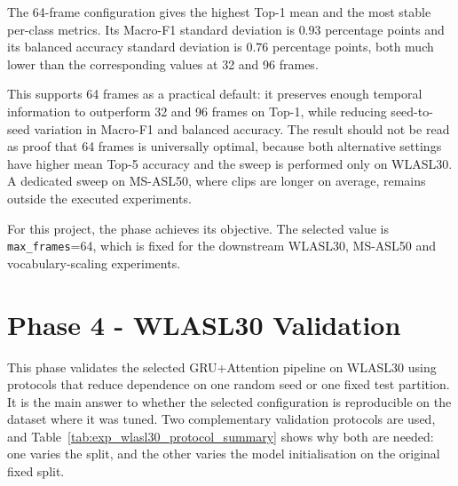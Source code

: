 \FloatBarrier

The 64-frame configuration gives the highest Top-1 mean and the most stable per-class metrics. Its
Macro-F1 standard deviation is $0.93$ percentage points and its balanced accuracy standard
deviation is $0.76$ percentage points, both much lower than the corresponding values at 32 and 96
frames.

This supports 64 frames as a practical default: it preserves enough temporal information to
outperform 32 and 96 frames on Top-1, while reducing seed-to-seed variation in Macro-F1 and
balanced accuracy. The result should not be read as proof that 64 frames is universally optimal,
because both alternative settings have higher mean Top-5 accuracy and the sweep is performed only
on WLASL30. A dedicated sweep on MS-ASL50, where clips are longer on average, remains outside the
executed experiments.

For this project, the phase achieves its objective. The selected value is \texttt{max\_frames}=64,
which is fixed for the downstream WLASL30, MS-ASL50 and vocabulary-scaling experiments.


\section{Phase 4 - WLASL30 Validation}
\label{sec:exp_wlasl30}

This phase validates the selected GRU+Attention pipeline on WLASL30 using protocols that reduce
dependence on one random seed or one fixed test partition. It is the main answer to whether the
selected configuration is reproducible on the dataset where it was tuned. Two complementary
validation protocols are used, and Table~\ref{tab:exp_wlasl30_protocol_summary} shows why both are
needed: one varies the split, and the other varies the model initialisation on the original fixed
split.

